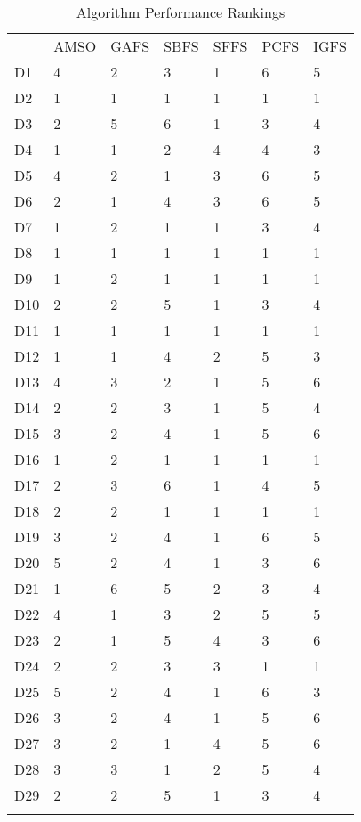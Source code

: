 \begin{table}
\caption{Algorithm Performance Rankings}
\label{tbl:algorithm:rank}
\begin{tabular}{lllllll}
\noalign{\smallskip}\hline\noalign{\smallskip}
&AMSO&GAFS&SBFS&SFFS&PCFS&IGFS\\
\noalign{\smallskip}\hline
D1&4&2&3&1&6&5\\
D2&1&1&1&1&1&1\\
D3&2&5&6&1&3&4\\
D4&1&1&2&4&4&3\\
D5&4&2&1&3&6&5\\
D6&2&1&4&3&6&5\\
D7&1&2&1&1&3&4\\
D8&1&1&1&1&1&1\\
D9&1&2&1&1&1&1\\
D10&2&2&5&1&3&4\\
D11&1&1&1&1&1&1\\
D12&1&1&4&2&5&3\\
D13&4&3&2&1&5&6\\
D14&2&2&3&1&5&4\\
D15&3&2&4&1&5&6\\
D16&1&2&1&1&1&1\\
D17&2&3&6&1&4&5\\
D18&2&2&1&1&1&1\\
D19&3&2&4&1&6&5\\
D20&5&2&4&1&3&6\\
D21&1&6&5&2&3&4\\
D22&4&1&3&2&5&5\\
D23&2&1&5&4&3&6\\
D24&2&2&3&3&1&1\\
D25&5&2&4&1&6&3\\
D26&3&2&4&1&5&6\\
D27&3&2&1&4&5&6\\
D28&3&3&1&2&5&4\\
D29&2&2&5&1&3&4\\
\noalign{\smallskip}\hline
\end{tabular}
\end{table}
